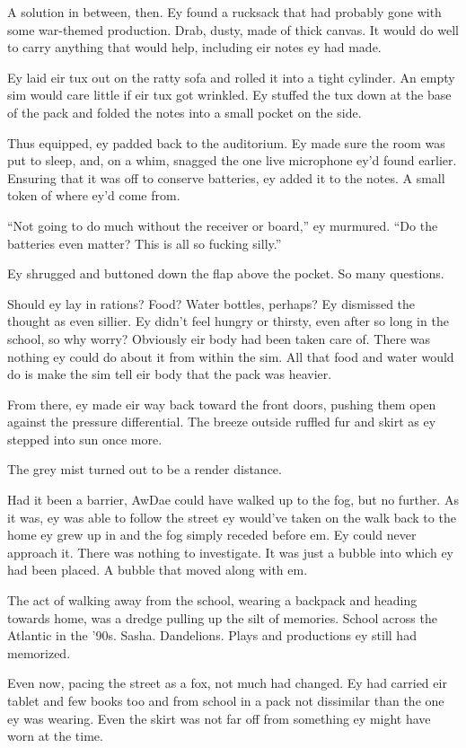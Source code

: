 A solution in between, then. Ey found a rucksack that had probably gone with some war-themed production. Drab, dusty, made of thick canvas. It would do well to carry anything that would help, including eir notes ey had made.

Ey laid eir tux out on the ratty sofa and rolled it into a tight cylinder. An empty sim would care little if eir tux got wrinkled. Ey stuffed the tux down at the base of the pack and folded the notes into a small pocket on the side.

Thus equipped, ey padded back to the auditorium. Ey made sure the room was put to sleep, and, on a whim, snagged the one live microphone ey'd found earlier. Ensuring that it was off to conserve batteries, ey added it to the notes. A small token of where ey'd come from.

``Not going to do much without the receiver or board,'' ey murmured. ``Do the batteries even matter? This is all so fucking silly.''

Ey shrugged and buttoned down the flap above the pocket. So many questions.

Should ey lay in rations? Food? Water bottles, perhaps? Ey dismissed the thought as even sillier. Ey didn't feel hungry or thirsty, even after so long in the school, so why worry? Obviously eir body had been taken care of. There was nothing ey could do about it from within the sim. All that food and water would do is make the sim tell eir body that the pack was heavier.

From there, ey made eir way back toward the front doors, pushing them open against the pressure differential. The breeze outside ruffled fur and skirt as ey stepped into sun once more.

The grey mist turned out to be a render distance.

Had it been a barrier, AwDae could have walked up to the fog, but no further. As it was, ey was able to follow the street ey would've taken on the walk back to the home ey grew up in and the fog simply receded before em. Ey could never approach it. There was nothing to investigate. It was just a bubble into which ey had been placed. A bubble that moved along with em.

The act of walking away from the school, wearing a backpack and heading towards home, was a dredge pulling up the silt of memories. School across the Atlantic in the '90s. Sasha. Dandelions. Plays and productions ey still had memorized.

Even now, pacing the street as a fox, not much had changed. Ey had carried eir tablet and few books too and from school in a pack not dissimilar than the one ey was wearing. Even the skirt was not far off from something ey might have worn at the time.

